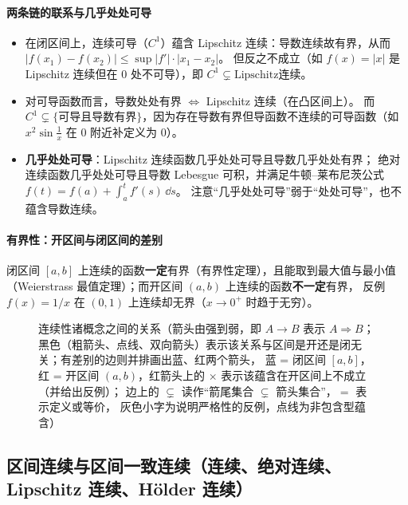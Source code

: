 \paragraph{两条链的联系与几乎处处可导}
\begin{itemize}
  \item 在闭区间上，连续可导（$C^1$）蕴含 Lipschitz 连续：导数连续故有界，从而
        $|f(x_1)-f(x_2)|\le \sup|f'|\cdot|x_1-x_2|$。
        但反之不成立（如 $f(x)=|x|$ 是 Lipschitz 连续但在 $0$ 处不可导），即 $C^1 \subsetneq \text{Lipschitz连续}$。
  \item 对可导函数而言，导数处处有界 $\iff$ Lipschitz 连续（在凸区间上）。
        而 $C^1 \subsetneq \{\text{可导且导数有界}\}$，因为存在导数有界但导函数不连续的可导函数（如 $x^2\sin\frac{1}{x}$ 在 $0$ 附近补定义为 $0$）。
  \item \textbf{几乎处处可导}：Lipschitz 连续函数几乎处处可导且导数几乎处处有界；
        绝对连续函数几乎处处可导且导数 Lebesgue 可积，并满足牛顿--莱布尼茨公式
        $f(t)=f(a)+\int_a^t f'(s)\,\dd s$。
        注意“几乎处处可导”弱于“处处可导”，也不蕴含导数连续。
\end{itemize}

\paragraph{有界性：开区间与闭区间的差别}
闭区间 $[a,b]$ 上连续的函数\textbf{一定}有界（有界性定理），且能取到最大值与最小值
（Weierstrass 最值定理）；而开区间 $(a,b)$ 上连续的函数\textbf{不一定}有界，
反例 $f(x)=1/x$ 在 $(0,1)$ 上连续却无界（$x\to0^+$ 时趋于无穷）。

\begin{figure}[!htbp]
\centering

\caption{连续性诸概念之间的关系（箭头由强到弱，即 $A\to B$ 表示 $A\Rightarrow B$；
  黑色（粗箭头、点线、双向箭头）表示该关系与区间是开还是闭无关；有差别的边则并排画出蓝、红两个箭头，
  蓝 = 闭区间 $[a,b]$，红 = 开区间 $(a,b)$，红箭头上的 $\times$ 表示该蕴含在开区间上不成立（并给出反例）；
  边上的 $\subsetneq$ 读作“箭尾集合 $\subsetneq$ 箭头集合”，$=$ 表示定义或等价，
  灰色小字为说明严格性的反例，点线为非包含型蕴含）}
\label{fig:continuity-poset}
\end{figure}


\subsection{区间连续与区间一致连续（连续、绝对连续、Lipschitz 连续、Hölder 连续）}

